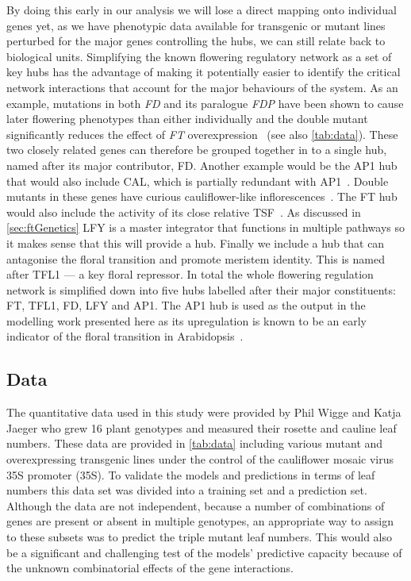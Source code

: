 By doing this early in our analysis we will lose a direct mapping onto individual genes yet, as we have phenotypic data available for transgenic or mutant lines perturbed for the major genes controlling the hubs, we can still relate back to biological units.
Simplifying the known flowering regulatory network as a set of key hubs has the advantage of making it potentially easier to identify the critical network interactions that account for the major behaviours of the system.
As an example, mutations in both \emph{FD} and its paralogue \emph{FDP} have been shown to cause later flowering phenotypes than either individually and the double mutant significantly reduces the effect of \emph{FT} overexpression~\cite{jaeger2013} (see also \autoref{tab:data}).
These two closely related genes can therefore be grouped together in to a single hub, named after its major contributor, FD.
Another example would be the AP1 hub that would also include CAL, which is partially redundant with AP1~\cite{bowman1993}.
Double mutants in these genes have curious cauliflower-like inflorescences~\cite{gustafson1994,ferrandiz2000}.
The FT hub would also include the activity of its close relative TSF~\cite{yamaguchi2005}.
As discussed in \autoref{sec:ftGenetics} LFY is a master integrator that functions in multiple pathways so it makes sense that this will provide a hub.
Finally we include a hub that can antagonise the floral transition and promote meristem identity.
This is named after TFL1 --- a key floral repressor.
In total the whole flowering regulation network is simplified down into five hubs labelled after their major constituents: FT, TFL1, FD, LFY and AP1.
The AP1 hub is used as the output in the modelling work presented here as its upregulation is known to be an early indicator of the floral transition in Arabidopsis~\cite{mandel1992,wigge2005}.

\subsection{Data}

The quantitative data used in this study were provided by Phil Wigge and Katja Jaeger who grew 16 plant genotypes and measured their rosette and cauline leaf numbers.
These data are provided in \autoref{tab:data} including various mutant and overexpressing transgenic lines under the control of the cauliflower mosaic virus 35S promoter (35S).
To validate the models and predictions in terms of leaf numbers this data set was divided into a training set and a prediction set.
Although the data are not independent, because a number of combinations of genes are present or absent in multiple genotypes, an appropriate way to assign to these subsets was to predict the triple mutant leaf numbers.
This would also be a significant and challenging test of the models' predictive capacity because of the unknown combinatorial effects of the gene interactions.

